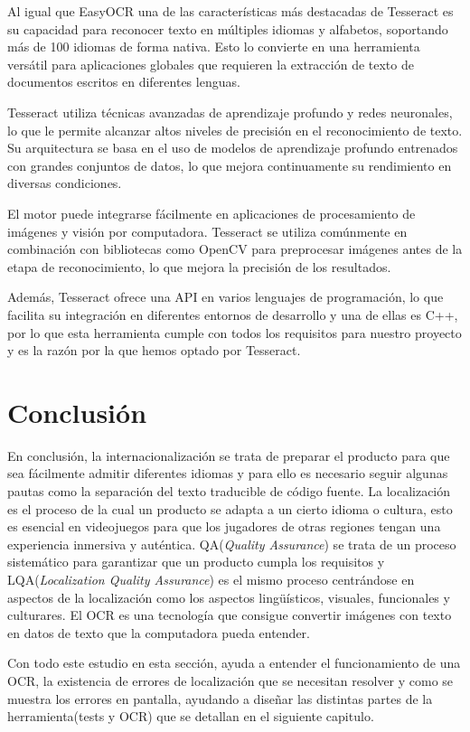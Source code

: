 \begin{enumerate}
	Al igual que EasyOCR una de las características más destacadas de Tesseract es su capacidad para reconocer texto en múltiples idiomas y alfabetos, soportando más de 100 idiomas de forma nativa. Esto lo convierte en una herramienta versátil para aplicaciones globales que requieren la extracción de texto de documentos escritos en diferentes lenguas.
	
	Tesseract utiliza técnicas avanzadas de aprendizaje profundo y redes neuronales, lo que le permite alcanzar altos niveles de precisión en el reconocimiento de texto. Su arquitectura se basa en el uso de modelos de aprendizaje profundo entrenados con grandes conjuntos de datos, lo que mejora continuamente su rendimiento en diversas condiciones.
	
	El motor puede integrarse fácilmente en aplicaciones de procesamiento de imágenes y visión por computadora. Tesseract se utiliza comúnmente en combinación con bibliotecas como OpenCV para preprocesar imágenes antes de la etapa de reconocimiento, lo que mejora la precisión de los resultados.
	
	Además, Tesseract ofrece una API en varios lenguajes de programación, lo que facilita su integración en diferentes entornos de desarrollo y una de ellas es C++, por lo que esta herramienta cumple con todos los requisitos para nuestro proyecto y es la razón por la que hemos optado por Tesseract.
\end{enumerate}
\section{Conclusión}
En conclusión, la internacionalización se trata de preparar el producto para que sea fácilmente admitir diferentes idiomas y para ello es necesario seguir algunas pautas como la separación del texto traducible de código fuente. La localización es el proceso de la cual un producto se adapta a un cierto idioma o cultura, esto es esencial en videojuegos para que los jugadores de otras regiones tengan una experiencia inmersiva y auténtica. QA(\textit{Quality Assurance}) se trata de un proceso sistemático para garantizar que un producto cumpla los requisitos y LQA(\textit{Localization Quality Assurance}) es el mismo proceso centrándose en aspectos de la localización como los aspectos lingüísticos, visuales, funcionales y culturares. El OCR es una tecnología que consigue convertir imágenes con texto en datos de texto que la computadora pueda entender.

Con todo este estudio en esta sección, ayuda a entender el funcionamiento de una OCR, la existencia de errores de localización que se necesitan resolver y como se muestra los errores en pantalla, ayudando a diseñar las distintas partes de la herramienta(tests y OCR) que se detallan en el siguiente capitulo.
